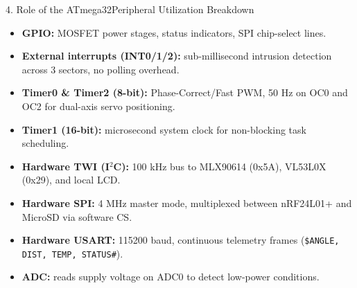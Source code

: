 \documentclass[aspectratio=169, 10pt]{beamer}
\begin{document}
\begin{frame}{4. Role of the ATmega32}{Peripheral Utilization Breakdown}
    \footnotesize
    \begin{itemize}
        \item \textbf{GPIO:} MOSFET power stages, status indicators, SPI chip-select lines.
        \item \textbf{External interrupts (INT0/1/2):} sub-millisecond intrusion detection across 3 sectors, no polling overhead.
        \item \textbf{Timer0 \& Timer2 (8-bit):} Phase-Correct/Fast PWM, 50 Hz on OC0 and OC2 for dual-axis servo positioning.
        \item \textbf{Timer1 (16-bit):} microsecond system clock for non-blocking task scheduling.
        \item \textbf{Hardware TWI (I$^2$C):} 100 kHz bus to MLX90614 (0x5A), VL53L0X (0x29), and local LCD.
        \item \textbf{Hardware SPI:} 4 MHz master mode, multiplexed between nRF24L01+ and MicroSD via software CS.
        \item \textbf{Hardware USART:} 115200 baud, continuous telemetry frames (\texttt{\$ANGLE, DIST, TEMP, STATUS\#}).
        \item \textbf{ADC:} reads supply voltage on ADC0 to detect low-power conditions.
    \end{itemize}
\end{frame}
\end{document}
